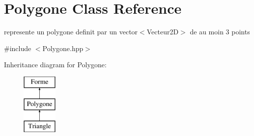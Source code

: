 \hypertarget{class_polygone}{}\section{Polygone Class Reference}
\label{class_polygone}


represente un polygone definit par un vector$<$\+Vecteur2\+D$>$ de au moin 3 points  




{\ttfamily \#include $<$Polygone.\+hpp$>$}

Inheritance diagram for Polygone\+:\begin{figure}[H]
\begin{center}
\leavevmode
\includegraphics[height=3.000000cm]{class_polygone}
\end{center}
\end{figure}
